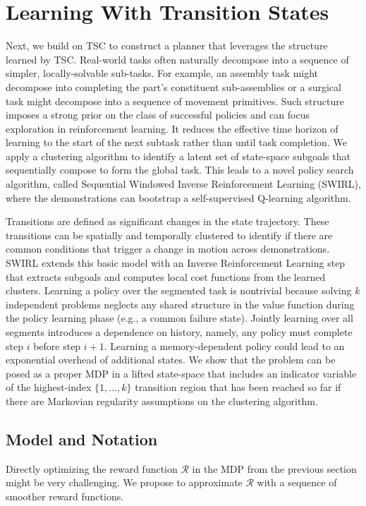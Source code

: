 \section{Learning With Transition States}
\label{swirl}
Next, we build on TSC to construct a planner that leverages the structure learned by TSC.
Real-world tasks often naturally decompose into a sequence of simpler, locally-solvable sub-tasks.
For example, an assembly task might decompose into completing the part's constituent sub-assemblies or a surgical task might decompose into a sequence of movement primitives.
Such structure imposes a strong prior on the class of successful policies and can focus exploration in reinforcement learning.
It reduces the effective time horizon of learning to the start of the next subtask rather than until task completion.
We apply a clustering algorithm to identify a latent set of state-space subgoals that sequentially compose to form the global task.
This leads to a novel policy search algorithm, called Sequential Windowed Inverse Reinforcement Learning (SWIRL),  where the demonstrations can bootstrap a self-supervised Q-learning algorithm.

 Transitions are defined as significant changes in the state trajectory. These transitions can be spatially and temporally clustered to identify if there are common conditions that trigger a change in motion across demonstrations.
SWIRL extends this basic model with an Inverse Reinforcement Learning step that extracts subgoals and computes local cost functions from the learned clusters. 
Learning a policy over the segmented task is nontrivial because solving $k$ independent problems neglects any shared structure in the value function during the policy learning phase (e.g., a common failure state).
Jointly learning over all segments introduces a dependence on history, namely, any policy must complete step $i$ before step $i+1$.
Learning a memory-dependent policy could lead to an exponential overhead of additional states. 
We show that the problem can be posed as a proper MDP in a lifted state-space that includes an indicator variable of the highest-index $\{1,...,k\}$ transition region that has been reached so far if there are Markovian regularity assumptions on the clustering algorithm.

\subsection*{Model and Notation}
Directly optimizing the reward function $\mathcal{R}$ in the MDP from the previous section might be very challenging.
We propose to approximate $\mathcal{R}$ with a sequence of smoother reward functions.

